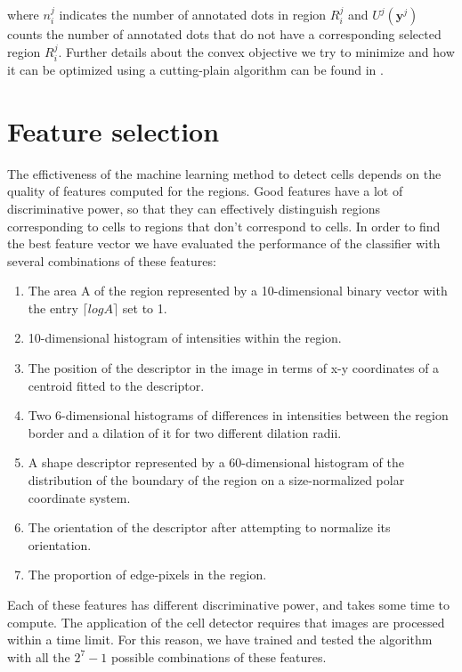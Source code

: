 	where $n_i^j$ indicates the number of annotated dots in region $R_i^j$ and $U^j(\textbf{y}^j)$ counts the number of annotated dots that do not have a corresponding selected region $R_i^j$. Further details about the convex objective we try to minimize and how it can be optimized using a cutting-plain algorithm can be found in \cite{arteta12}.
		
	\section{Feature selection \statusfirstdraft}
	\label{sec:detector_feature}
	
	The effictiveness of the machine learning method to detect cells depends on the quality of features computed for the regions. Good features have a lot of discriminative power, so that they can effectively distinguish regions corresponding to cells to regions that don't correspond to cells. In order to find the best feature vector we have evaluated the performance of the classifier with several combinations of these features:
	
	\begin{enumerate}
	    \item The area A of the region represented by a 10-dimensional binary vector with the entry $\lceil log A \rceil $ set to 1.
		\item 10-dimensional histogram of intensities within the region.
	    \item The position of the descriptor in the image in terms of x-y coordinates of a centroid fitted to the descriptor.
	    \item Two 6-dimensional histograms of differences in intensities between the region border and a dilation of it for two different dilation radii.
	    \item A shape descriptor represented by a 60-dimensional histogram of the distribution of the boundary of the region on a size-normalized polar coordinate system.
	    \item The orientation of the descriptor after attempting to normalize its orientation.
	    \item The proportion of edge-pixels in the region.
	\end{enumerate}
	
	Each of these features has different discriminative power, and takes some time to compute. The application of the cell detector requires that images are processed within a time limit. For this reason, we have trained and tested the algorithm with all the $2^7 - 1$ possible combinations of these features.
	

